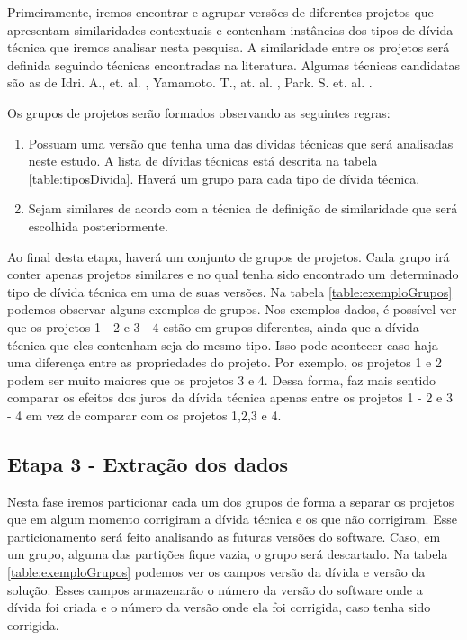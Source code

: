 Primeiramente, iremos encontrar e agrupar versões de diferentes projetos que apresentam similaridades contextuais e contenham instâncias dos tipos de dívida técnica que iremos analisar nesta pesquisa. A similaridade entre os projetos será definida seguindo técnicas encontradas na literatura. Algumas técnicas candidatas são as de Idri. A., et. al. \cite{idri2001fuzzy}, Yamamoto. T., at. al. \cite{yamamoto2005measuring}, Park. S. et. al. \cite{park2012similarity}.

Os grupos de projetos serão formados observando as seguintes regras:
\begin{enumerate}
\item Possuam uma versão que tenha uma das dívidas técnicas que será analisadas neste estudo. A lista de dívidas técnicas está descrita na tabela \ref{table:tiposDivida}. Haverá um grupo para cada tipo de dívida técnica. 
\item Sejam similares de acordo com a técnica de definição de similaridade que será escolhida posteriormente.
\end{enumerate}

Ao final desta etapa, haverá um conjunto de grupos de projetos. Cada grupo irá conter apenas projetos similares e no qual tenha sido encontrado um determinado tipo de dívida técnica em uma de suas versões. Na tabela \ref{table:exemploGrupos} podemos observar alguns exemplos de grupos. Nos exemplos dados, é possível ver que os projetos 1 - 2 e 3 - 4 estão em grupos diferentes, ainda que a dívida técnica que eles contenham seja do mesmo tipo. Isso pode acontecer caso haja uma diferença entre as propriedades do projeto. Por exemplo, os projetos 1 e 2 podem ser muito maiores que os projetos 3 e 4. Dessa forma, faz mais sentido comparar os efeitos dos juros da dívida técnica apenas entre os projetos 1 - 2  e 3 - 4 em vez de comparar com os projetos 1,2,3 e 4. 





\subsection{Etapa 3 - Extração dos dados}

Nesta fase iremos particionar cada um dos grupos de forma a separar os projetos que em algum momento corrigiram a dívida técnica e os que não corrigiram. Esse particionamento será feito analisando as futuras versões do software. Caso, em um grupo, alguma das partições fique vazia, o grupo será descartado. Na tabela \ref{table:exemploGrupos} podemos ver os campos versão da dívida e versão da solução. Esses campos armazenarão o número da versão do software onde a dívida foi criada e o número da versão onde ela foi corrigida, caso tenha sido corrigida. 



